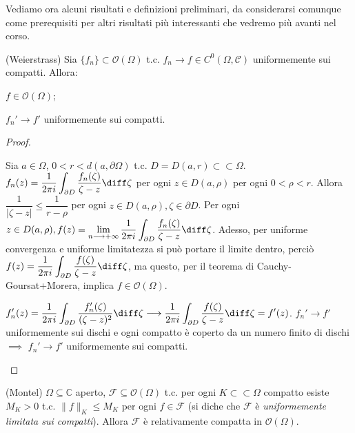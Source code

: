 Vediamo ora alcuni risultati e definizioni preliminari, da considerarsi comunque come prerequisiti per altri risultati più interessanti che vedremo più avanti nel corso.

\begin{thm}
  (Weierstrass) Sia $\{f_n\} \subset \mathcal{O}(\Omega)$ t.c. $f_n \longrightarrow f \in C^0(\Omega, \mathcal{C})$ uniformemente sui compatti. Allora:
  \begin{nlist}
    \item $f \in \mathcal{O}(\Omega)$;
    \item $f_n' \longrightarrow f'$ uniformemente sui compatti.
  \end{nlist}
\end{thm}

\begin{proof}
  \begin{nlist}
    \item Sia $a \in \Omega$, $0<r<d(a, \partial\Omega)$ t.c. $D=D(a, r) \subset \subset \Omega$. $\displaystyle f_n(z)=\frac{1}{2\pi i} \int_{\partial D} \frac{f_n(\zeta)}{\zeta-z} \diff \zeta$ per ogni $z \in D(a, \rho)$ per ogni $0<\rho<r$.
    Allora $\dfrac{1}{|\zeta-z|} \le \dfrac{1}{r-\rho}$ per ogni $z \in D(a, \rho), \zeta \in \partial{D}$.
    Per ogni $\displaystyle z \in D(a, \rho), f(z)=\lim_{n \longrightarrow +\infty} \frac{1}{2\pi i} \int_{\partial D} \frac{f_n(\zeta)}{\zeta-z} \diff \zeta$.
    Adesso, per uniforme convergenza e uniforme limitatezza si può portare il limite dentro, perciò $\displaystyle f(z)=\frac{1}{2\pi i}\int_{\partial D} \frac{f(\zeta)}{\zeta-z} \diff \zeta$, ma questo, per il teorema di Cauchy-Goursat+Morera, implica $f \in \mathcal{O}(\Omega)$.
    \item $\displaystyle f_n'(z)=\frac{1}{2\pi i} \int_{\partial D} \frac{f_n'(\zeta)}{(\zeta-z)^2}\diff\zeta \longrightarrow \frac{1}{2\pi i} \int_{\partial D} \frac{f(\zeta)}{\zeta-z} \diff\zeta=f'(z)$.
    $f_n' \longrightarrow f'$ uniformemente sui dischi e ogni compatto è coperto da un numero finito di dischi $\implies$ $f_n' \longrightarrow f'$ uniformemente sui compatti.
  \end{nlist}
\end{proof}

\begin{thm}
  (Montel) $\Omega \subseteq \mathbb{C}$ aperto, $\mathcal{F} \subseteq \mathcal{O}(\Omega)$ t.c. per ogni $K \subset \subset \Omega$ compatto esiste $M_K>0$ t.c. $\|f\|_K \le M_K$ per ogni $f \in \mathcal{F}$ (si diche che $\mathcal{F}$ è \textit{uniformemente limitata sui compatti}).
  Allora $\mathcal{F}$ è relativamente compatta in $\mathcal{O}(\Omega)$.
\end{thm}

